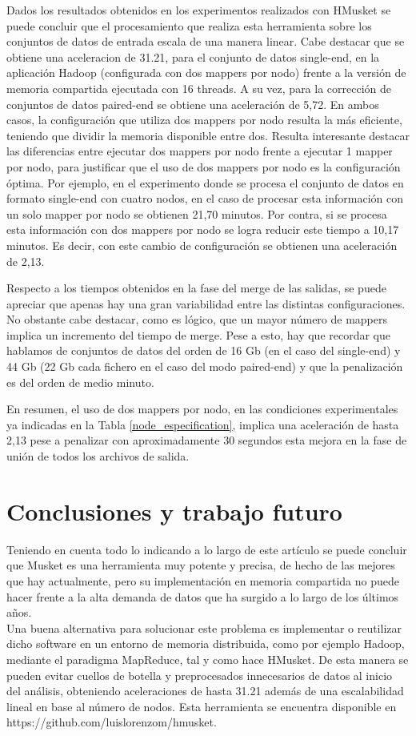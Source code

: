 \documentclass[conference]{IEEEtran}
\begin{document}
Dados los resultados obtenidos en los experimentos realizados con HMusket se puede concluir que el procesamiento que realiza esta herramienta sobre los conjuntos de datos de entrada escala de una manera linear. Cabe destacar que se obtiene una aceleracion de 31.21, para el conjunto de datos single-end, en la aplicación Hadoop (configurada con dos mappers por nodo) frente a la versión de memoria compartida ejecutada con 16 threads. A su vez, para la corrección de conjuntos de datos paired-end se obtiene una aceleración de 5,72. En ambos casos, la configuración que utiliza dos mappers por nodo resulta la más eficiente, teniendo que dividir la memoria disponible entre dos. Resulta interesante destacar las diferencias entre ejecutar dos mappers por nodo frente a ejecutar 1 mapper por nodo, para justificar que el uso de dos mappers por nodo es la configuración óptima. Por ejemplo, en el experimento donde se procesa el conjunto de datos en formato single-end con cuatro nodos, en el caso de procesar esta información con un solo mapper por nodo se obtienen 21,70 minutos. Por contra, si se procesa esta información con dos mappers por nodo se logra reducir este tiempo a  10,17 minutos. Es decir, con este cambio de configuración se obtienen una aceleración de 2,13.

Respecto a los tiempos obtenidos en la fase del merge de las salidas, se puede apreciar que apenas hay una gran variabilidad entre las distintas configuraciones. No obstante cabe destacar, como es lógico, que un mayor número de mappers implica un incremento del tiempo de merge. Pese a esto, hay que recordar que hablamos de conjuntos de datos del orden de 16 Gb (en el caso del single-end) y 44 Gb (22 Gb cada fichero en el caso del modo paired-end) y que la penalización es del orden de medio minuto.

En resumen, el uso de dos mappers por nodo, en las condiciones experimentales ya indicadas en la Tabla \ref{node_especification}, implica una aceleración de hasta 2,13 pese a penalizar con aproximadamente 30 segundos esta mejora en la fase de unión de todos los archivos de salida.

\section{Conclusiones y trabajo futuro}
Teniendo en cuenta todo lo indicando a lo largo de este artículo se puede concluir que Musket es una herramienta muy potente y precisa, de hecho de las mejores que hay actualmente, pero su implementación en memoria compartida no puede hacer frente a la alta demanda de datos que ha surgido a lo largo de los últimos años.\\
Una buena alternativa para solucionar este problema es implementar o reutilizar dicho software en un entorno de memoria distribuida, como por ejemplo Hadoop, mediante el paradigma MapReduce, tal y como hace HMusket. De esta manera se pueden evitar cuellos de botella y preprocesados innecesarios de datos al inicio del análisis, obteniendo aceleraciones de hasta 31.21 además de una escalabilidad lineal en base al número de nodos. Esta herramienta se encuentra disponible en https://github.com/luislorenzom/hmusket.
\end{document}
